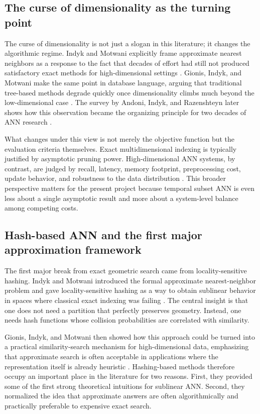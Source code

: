 \documentclass[sigconf,nonacm]{acmart}
\begin{document}
\subsection{The curse of dimensionality as the turning point}

The curse of dimensionality is not just a slogan in this literature; it changes the algorithmic regime. Indyk and Motwani explicitly frame approximate nearest neighbors as a response to the fact that decades of effort had still not produced satisfactory exact methods for high-dimensional settings \cite{indyk1998}. Gionis, Indyk, and Motwani make the same point in database language, arguing that traditional tree-based methods degrade quickly once dimensionality climbs much beyond the low-dimensional case \cite{gionis1999}. The survey by Andoni, Indyk, and Razenshteyn later shows how this observation became the organizing principle for two decades of ANN research \cite{andoni2018}.

What changes under this view is not merely the objective function but the evaluation criteria themselves. Exact multidimensional indexing is typically justified by asymptotic pruning power. High-dimensional ANN systems, by contrast, are judged by recall, latency, memory footprint, preprocessing cost, update behavior, and robustness to the data distribution \cite{muja2014,fu2019,malkov2020,johnson2021}. This broader perspective matters for the present project because temporal subset ANN is even less about a single asymptotic result and more about a system-level balance among competing costs.

\subsection{Hash-based ANN and the first major approximation framework}

The first major break from exact geometric search came from locality-sensitive hashing. Indyk and Motwani introduced the formal approximate nearest-neighbor problem and gave locality-sensitive hashing as a way to obtain sublinear behavior in spaces where classical exact indexing was failing \cite{indyk1998}. The central insight is that one does not need a partition that perfectly preserves geometry. Instead, one needs hash functions whose collision probabilities are correlated with similarity.

Gionis, Indyk, and Motwani then showed how this approach could be turned into a practical similarity-search mechanism for high-dimensional data, emphasizing that approximate search is often acceptable in applications where the representation itself is already heuristic \cite{gionis1999}. Hashing-based methods therefore occupy an important place in the literature for two reasons. First, they provided some of the first strong theoretical intuitions for sublinear ANN. Second, they normalized the idea that approximate answers are often algorithmically and practically preferable to expensive exact search.
\end{document}
